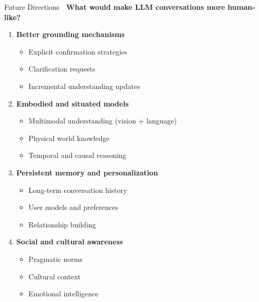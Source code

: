 \documentclass[aspectratio=169]{beamer}
\begin{document}
\begin{frame}[shrink=10]{Future Directions 🔮}
    \textbf{What would make LLM conversations more human-like?}

    \vspace{0.3cm}

    \begin{enumerate}\setlength{\itemsep}{0pt}
        \item \textbf{Better grounding mechanisms}
        \begin{itemize}\setlength{\itemsep}{0pt}
            \item Explicit confirmation strategies
            \item Clarification requests
            \item Incremental understanding updates
        \end{itemize}

        \item \textbf{Embodied and situated models}
        \begin{itemize}\setlength{\itemsep}{0pt}
            \item Multimodal understanding (vision + language)
            \item Physical world knowledge
            \item Temporal and causal reasoning
        \end{itemize}

        \item \textbf{Persistent memory and personalization}
        \begin{itemize}\setlength{\itemsep}{0pt}
            \item Long-term conversation history
            \item User models and preferences
            \item Relationship building
        \end{itemize}

        \item \textbf{Social and cultural awareness}
        \begin{itemize}\setlength{\itemsep}{0pt}
            \item Pragmatic norms
            \item Cultural context
            \item Emotional intelligence
        \end{itemize}
    \end{enumerate}
\end{frame}
\end{document}
